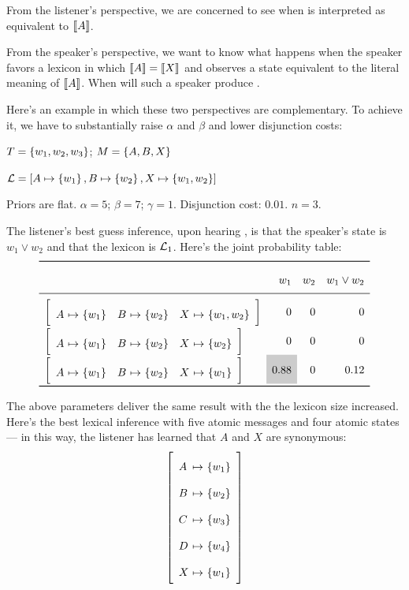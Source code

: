 \documentclass{article}
\begin{document}
\begin{examples}
\item From the listener's perspective, we are concerned to see when
   is interpreted as equivalent to $\llbracket A\rrbracket$.

\item From the speaker's perspective, we want to know what happens
  when the speaker favors a lexicon in which $\llbracket A\rrbracket=\llbracket X\rrbracket$ and
  observes a state equivalent to the literal meaning of $\llbracket A\rrbracket$.
  When will such a speaker produce .

\item Here's an example in which these two perspectives are
  complementary. To achieve it, we have to substantially raise
  $\alpha$ and $\beta$ and lower disjunction costs:

  \begin{examples}
  \item $T = \left\{ w_{1}, w_{2}, w_{3} \right\}$;  $M = \left\{ A, B, X \right\}$
  \item $\mathcal{L} = [A \mapsto \left\{ w_{1} \right\}, B \mapsto \left\{ w_{2} \right\}, X \mapsto \left\{ w_{1}, w_{2} \right\}]$
  \item Priors are flat. $\alpha = 5$; $\beta = 7$; $\gamma = 1$. Disjunction cost: $0.01$. $n = 3$. 
  \end{examples}

\item The listener's best guess inference, upon hearing ,
  is that the speaker's state is $w_{1} \vee w_{2}$ and that the
  lexicon is $\mathcal{L}_{1}$. Here's the joint probability table:
  \[
  \renewcommand{\arraystretch}{2}
  \begin{array}[c]{l r r r}
    \toprule
            & w_{1} & w_{2} & w_{1} \vee w_{2} \\
    \midrule
    \smallhurfordlex{w_{1}}{w_{2}}{w_{1}, w_{2}} & 0 & 0 & 0 \\
    \smallhurfordlex{w_{1}}{w_{2}}{w_{2}}        & 0 & 0 & 0 \\
    \smallhurfordlex{w_{1}}{w_{2}}{w_{1}}        & \graycell{0.88} & 0 & 0.12\\
    \bottomrule
  \end{array}
  \]

\item The above parameters deliver the same result with the the
  lexicon size increased. Here's the best lexical inference with five
  atomic messages and four atomic states --- in this way, the 
  listener has learned that $A$ and $X$ are synonymous:
  \[
  \left[
    \begin{array}[c]{l@{ \ \mapsto \ }l}
      A & \set{w_{1}} \\
      B & \set{w_{2}} \\
      C & \set{w_{3}} \\
      D & \set{w_{4}} \\
      X & \set{w_{1}}
    \end{array}
  \right]
  \]  


\end{examples}
\end{document}
